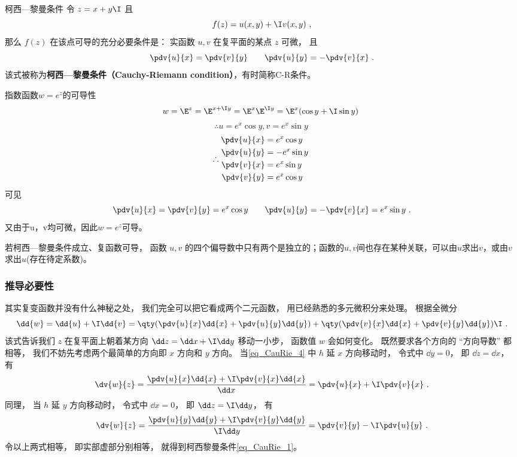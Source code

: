 \begin{theorem}{柯西—黎曼条件}
令 $z = x + y\I$ 且
\begin{equation}
f(z) = u(x, y) + \I v(x, y)~,
\end{equation}
那么 $f(z)$ 在该点可导的充分必要条件是： 实函数 $u,v$ 在复平面的某点 $z$ 可微， 且
\begin{equation}\label{eq_CauRie_1}
\pdv{u}{x} = \pdv{v}{y} \qquad
\pdv{u}{y} = - \pdv{v}{x}~.
\end{equation}
该式被称为\textbf{柯西—黎曼条件（Cauchy-Riemann condition）}，有时简称C-R条件。
\end{theorem}

\begin{example}{指数函数$w=e^z$的可导性}
$$w = \E^z = \E^{x + \I y} = \E^x \E^{\I y}=\E^x(\cos y + \I\sin y)~
$$
$$\therefore u=e^x\cos y, v = e^x\sin y~
$$
$$
\therefore
\begin{aligned}
\pdv{u}{x} &= e^x\cos y\\
\pdv{u}{y} &= -e^x\sin y\\
\pdv{v}{x} &= e^x\sin y\\
\pdv{v}{y} &= e^x\cos y\\
\end{aligned}~
$$
可见
\begin{equation}
\pdv{u}{x} = \pdv{v}{y}= e^x\cos y \qquad
\pdv{u}{y} = - \pdv{v}{x}= e^x\sin y~.
\end{equation}
又由于u，v均可微，因此$w=e^z$可导。
\end{example}

若柯西—黎曼条件成立、复函数可导， 函数 $u,v$ 的四个偏导数中只有两个是独立的；函数的$u,v$间也存在某种关联，可以由$u$求出$v$，或由$v$求出$u$(存在待定系数)。

\subsubsection{推导必要性}
其实复变函数并没有什么神秘之处， 我们完全可以把它看成两个二元函数， 用已经熟悉的多元微积分来处理。 根据全微分
\begin{equation}\label{eq_CauRie_2}
\dd{w} = \dd{u} + \I \dd{v} = \qty(\pdv{u}{x} \dd{x} + \pdv{u}{y} \dd{y}) + \qty(\pdv{v}{x} \dd{x} + \pdv{v}{y} \dd{y})\I~.
\end{equation}
该式告诉我们 $z$ 在复平面上朝着某方向 $\dd z = \dd x + \I \dd y$ 移动一小步， 函数值 $w$ 会如何变化。 既然要求各个方向的 “方向导数” 都相等， 我们不妨先考虑两个最简单的方向即 $x$ 方向和 $y$ 方向。 当\autoref{eq_CauRie_4} 中 $h$ 延 $x$ 方向移动时， 令式中 $\dd y = 0$， 即 $\dd z = \dd x$， 有
\begin{equation}
\dv{w}{z} = \frac{\pdv{u}{x} \dd{x} +  \I\pdv{v}{x} \dd{x}}{\dd x} = \pdv{u}{x} +  \I\pdv{v}{x}~.
\end{equation}
同理， 当 $h$ 延 $y$ 方向移动时， 令式中 $\dd x = 0$， 即 $\dd z = \I\dd y$， 有
\begin{equation}
\dv{w}{z} = \frac{\pdv{u}{y} \dd{y} + \I\pdv{v}{y} \dd{y}}{\I \dd y} = \pdv{v}{y} -\I \pdv{u}{y}~.
\end{equation}
令以上两式相等， 即实部虚部分别相等， 就得到柯西黎曼条件\autoref{eq_CauRie_1}。

